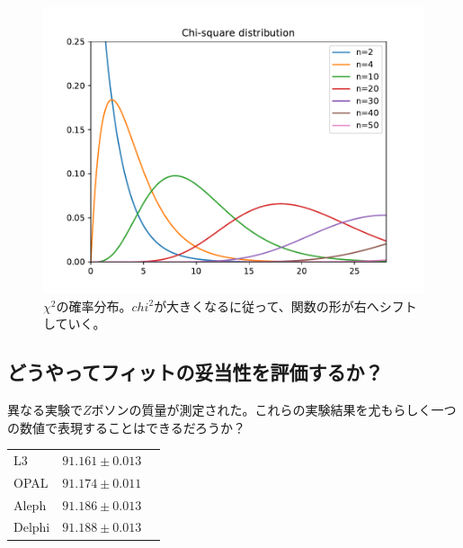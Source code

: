 \begin{figure}[h]
  \centering
  \includegraphics[scale=0.5]{python/ChiSquareDistribution.pdf}
  \caption{$\chi^2$の確率分布。$chi^2$が大きくなるに従って、関数の形が右へシフトしていく。}
\end{figure}


\subsection{どうやってフィットの妥当性を評価するか？}
異なる実験で$Z$ボソンの質量が測定された。これらの実験結果を尤もらしく一つの数値で表現することはできるだろうか？

\begin{table}
  \centering
  \begin{tabular}{lll}
    L3        & $91.161 \pm 0.013$   \\
    OPAL      & $91.174 \pm 0.011$    \\
    Aleph       & $91.186 \pm 0.013$ \\
    Delphi      & $91.188 \pm 0.013$
  \end{tabular}
\end{table}



